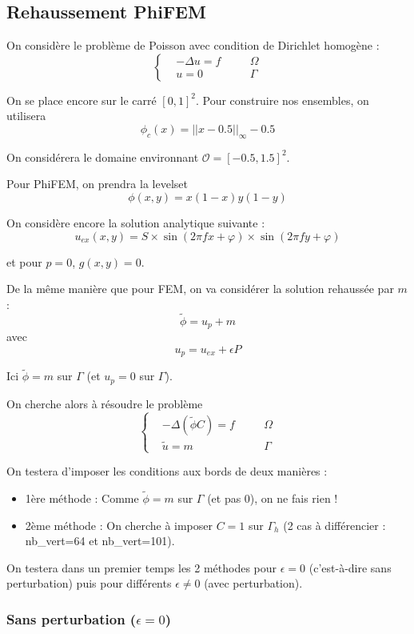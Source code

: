\subsection{Rehaussement PhiFEM}

On considère le problème de Poisson avec condition de Dirichlet homogène :
$$\left\{\begin{aligned}
	&-\Delta u=f \quad &&\Omega \\
	&u=0 \quad &&\Gamma
\end{aligned}\right.$$

On se place encore sur le carré $[0,1]^2$. Pour construire nos ensembles, on utilisera
$$\phi_c (x)=||x-0.5||_\infty-0.5$$

On considérera le domaine environnant $\mathcal{O}=[-0.5,1.5]^2$.

Pour PhiFEM, on prendra la levelset
$$\phi (x,y)=x(1-x)y(1-y)$$

On considère encore la solution analytique suivante :
$$u_{ex}(x,y) = S\times\sin(2\pi fx + \varphi)\times\sin(2\pi fy + \varphi)$$ 

et pour $p=0$, $g(x,y)=0$.

De la même manière que pour FEM, on va considérer la solution rehaussée par $m$ :
$$\tilde{\phi}=u_p+m$$
avec
$$u_p=u_{ex}+\epsilon P$$

\begin{Rem}
	Ici $\tilde{\phi}=m$ sur $\Gamma$ (et $u_p=0$ sur $\Gamma$).
\end{Rem}

On cherche alors à résoudre le problème
$$\left\{\begin{aligned}
	&-\Delta(\tilde{\phi}C)=f \quad &&\Omega \\
	&\tilde{u}=m \quad &&\Gamma
\end{aligned}\right.$$

On testera d'imposer les conditions aux bords de deux manières :
\begin{itemize}
	\item 1ère méthode : Comme $\tilde{\phi}=m$ sur $\Gamma$ (et pas 0), on ne fais rien !
	\item 2ème méthode : On cherche à imposer $C=1$ sur $\Gamma_h$ (2 cas à différencier : nb\_vert=64 et nb\_vert=101).
\end{itemize}

On testera dans un premier temps les 2 méthodes pour $\epsilon=0$ (c'est-à-dire sans perturbation) puis pour différents $\epsilon\ne 0$ (avec perturbation).

\subsubsection*{Sans perturbation ($\epsilon=0$)}

